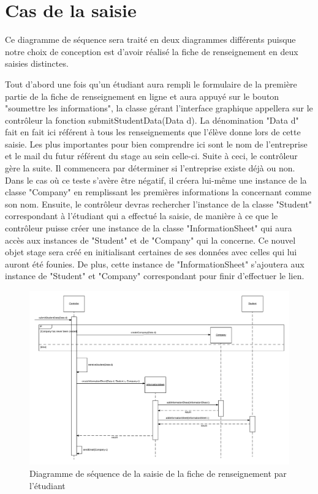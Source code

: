 \documentclass{scrreprt}
\begin{document}
\section{Cas de la saisie}

	Ce diagramme de séquence sera traité en deux diagrammes différents puisque notre choix de conception est d'avoir réalisé
la fiche de renseignement en deux saisies distinctes.

	Tout d'abord une fois qu'un étudiant aura rempli le formulaire de la première partie de la fiche de renseignement en ligne et aura
appuyé sur le bouton "soumettre les informations", la classe gérant l'interface graphique appellera sur le contrôleur la fonction 
submitStudentData(Data d). La dénomination "Data d" fait en fait ici référent à tous les renseignements que l'élève donne lors de 
cette saisie. Les plus importantes pour bien comprendre ici sont le nom de l'entreprise et le mail du futur référent du stage au sein
celle-ci. Suite à ceci, le contrôleur gère la suite. Il commencera par déterminer si l'entreprise existe déjà ou non. Dans le cas où
ce teste s'avère être négatif, il créera lui-même une instance de la classe "Company" en remplissant les premières informations la 
concernant comme son nom. Ensuite, le contrôleur devras rechercher l'instance de la classe "Student" correspondant à l'étudiant qui
a effectué la saisie, de manière à ce que le contrôleur puisse créer une instance de la classe "InformationSheet" qui aura accès aux instances
de "Student" et de "Company" qui la concerne. Ce nouvel objet stage sera créé en initialisant certaines de ses données avec celles qui lui
auront été founies. De plus, cette instance de "InformationSheet" s'ajoutera aux instance de "Student" et "Company" correspondant pour finir 
d'effectuer le lien.

\newpage
\begin{figure}[h]
\centering
\includegraphics[width=15cm]{images/submitStudentSeqDiagram.png}
\caption{Diagramme de séquence de la saisie de la fiche de renseignement par l'étudiant}
\end{figure}
\end{document}

